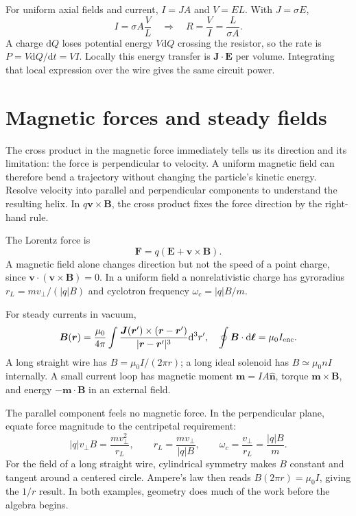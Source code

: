 \documentclass[11pt,oneside]{book}
\newcommand{\dd}{\mathrm{d}}
\newcommand{\vect}[1]{\boldsymbol{#1}}
\newcommand{\mun}{\mu_0}
\theoremstyle{reviewstyle}
\begin{document}
For uniform axial fields and current, $I=JA$ and $V=EL$. With $J=\sigma E$,
\begin{equation}
I=\sigma A\frac VL\quad\Longrightarrow\quad R=\frac VI=\frac{L}{\sigma A}.
\end{equation}
A charge $\dd Q$ loses potential energy $V\dd Q$ crossing the resistor, so the rate is $P=V\dd Q/\dd t=VI$. Locally this energy transfer is $\vect J\cdot\vect E$ per volume. Integrating that local expression over the wire gives the same circuit power.

\section{Magnetic forces and steady fields}
The cross product in the magnetic force immediately tells us its direction and its limitation: the force is perpendicular to velocity. A uniform magnetic field can therefore bend a trajectory without changing the particle's kinetic energy. Resolve velocity into parallel and perpendicular components to understand the resulting helix. In $q\vect v\times\vect B$, the cross product fixes the force direction by the right-hand rule.

The Lorentz force is
\begin{equation}\vect F=q(\vect E+\vect v\times\vect B).\end{equation}
A magnetic field alone changes direction but not the speed of a point charge, since $\vect v\cdot(\vect v\times\vect B)=0$. In a uniform field a nonrelativistic charge has gyroradius $r_L=mv_\perp/(|q|B)$ and cyclotron frequency $\omega_c=|q|B/m$.

For steady currents in vacuum,
\begin{equation}
\vect B(\vect r)=\frac{\mun}{4\pi}\int\frac{\vect J(\vect r')\times(\vect r-\vect r')}{|\vect r-\vect r'|^3}\dd^3r',
\quad \oint\vect B\cdot\dd\vect\ell=\mun I_{\rm enc}.
\end{equation}
A long straight wire has $B=\mun I/(2\pi r)$; a long ideal solenoid has $B\simeq\mun nI$ internally. A small current loop has magnetic moment $\vect m=IA\hat{\vect n}$, torque $\vect m\times\vect B$, and energy $-\vect m\cdot\vect B$ in an external field.

The parallel component feels no magnetic force. In the perpendicular plane, equate force magnitude to the centripetal requirement:
\begin{equation}
|q|v_\perp B=\frac{mv_\perp^2}{r_L},\qquad
r_L=\frac{mv_\perp}{|q|B},\qquad
\omega_c=\frac{v_\perp}{r_L}=\frac{|q|B}{m}.
\end{equation}
For the field of a long straight wire, cylindrical symmetry makes $B$ constant and tangent around a centered circle. Ampere's law then reads $B(2\pi r)=\mun I$, giving the $1/r$ result. In both examples, geometry does much of the work before the algebra begins.
\end{document}
